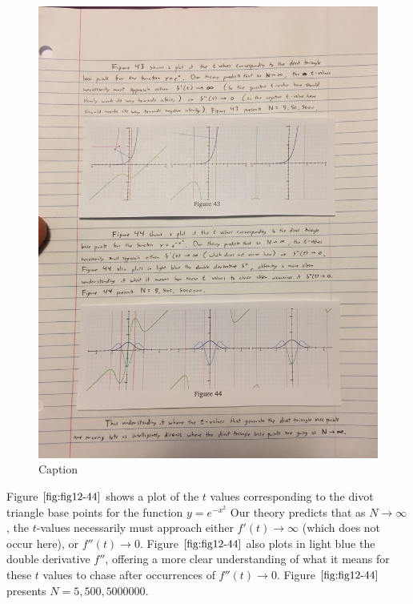 \begin{figure}[H]
    \centering
    \begin{minipage}[b]{0.9\linewidth}
        \includegraphics[width=.9\linewidth, height=.25\textheight, keepaspectratio]{solving-divot-paths-img/Fig 12-43.png}
        \caption{Caption}
        \label{fig:fig12-43}
    \end{minipage}
\end{figure}

Figure $\ref{fig:fig12-44}$ shows a plot of the $t$ values corresponding to the divot triangle base points for the function $y = e^{-x^2}$ Our theory predicts that as $N \xrightarrow{} \infty$, the $t$-values necessarily must approach either $f'(t) \xrightarrow{} \infty$ (which does not occur here), or $f''(t) \xrightarrow{} 0$. Figure $\ref{fig:fig12-44}$ also plots in light blue the double derivative $f''$, offering a more clear understanding of what it means for these $t$ values to chase after occurrences of $f''(t) \xrightarrow{} 0$. Figure $\ref{fig:fig12-44}$ presents $N = 5, 500, 5000000$.


